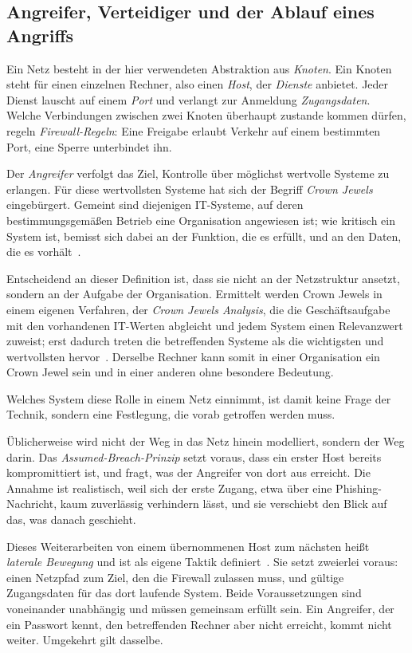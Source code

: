 \subsection{Angreifer, Verteidiger und der Ablauf eines Angriffs}
\label{sec:angreifer-verteidiger}

Ein Netz besteht in der hier verwendeten Abstraktion aus \emph{Knoten}. Ein
Knoten steht für einen einzelnen Rechner, also einen \emph{Host}, der
\emph{Dienste} anbietet. Jeder Dienst lauscht auf einem \emph{Port} und verlangt
zur Anmeldung \emph{Zugangsdaten}. Welche Verbindungen zwischen zwei Knoten
überhaupt zustande kommen dürfen, regeln \emph{Firewall-Regeln}: Eine Freigabe
erlaubt Verkehr auf einem bestimmten Port, eine Sperre unterbindet ihn.

Der \emph{Angreifer} verfolgt das Ziel, Kontrolle über möglichst wertvolle
Systeme zu erlangen. Für diese wertvollsten Systeme hat sich der Begriff
\emph{Crown Jewels} eingebürgert. Gemeint sind diejenigen IT-Systeme, auf deren
bestimmungsgemäßen Betrieb eine Organisation angewiesen ist; wie kritisch ein
System ist, bemisst sich dabei an der Funktion, die es erfüllt, und an den
Daten, die es vorhält~\cite[Abschn.~II.A]{gangupantulu2021cja}.

Entscheidend an dieser Definition ist, dass sie nicht an der Netzstruktur
ansetzt, sondern an der Aufgabe der Organisation. Ermittelt werden Crown Jewels
in einem eigenen Verfahren, der \emph{Crown Jewels Analysis}, die die
Geschäftsaufgabe mit den vorhandenen IT-Werten abgleicht und jedem System einen
Relevanzwert zuweist; erst dadurch treten die betreffenden Systeme als die
wichtigsten und wertvollsten hervor~\cite[Abschn.~II.A]{gangupantulu2021cja}.
Derselbe Rechner kann somit in einer Organisation ein Crown Jewel sein und in
einer anderen ohne besondere Bedeutung.

Welches System diese Rolle in einem Netz einnimmt, ist damit keine Frage der
Technik, sondern eine Festlegung, die vorab getroffen werden muss.

Üblicherweise wird nicht der Weg in das Netz hinein modelliert, sondern der Weg
darin. Das \emph{Assumed-Breach-Prinzip} setzt voraus, dass ein erster Host
bereits kompromittiert ist, und fragt, was der Angreifer von dort aus erreicht.
Die Annahme ist realistisch, weil sich der erste Zugang, etwa über eine
Phishing-Nachricht, kaum zuverlässig verhindern lässt, und sie verschiebt den
Blick auf das, was danach geschieht.

Dieses Weiterarbeiten von einem übernommenen Host zum nächsten heißt
\emph{laterale Bewegung} und ist als eigene Taktik
definiert~\cite{mitreattack}. Sie setzt zweierlei voraus: einen Netzpfad zum
Ziel, den die Firewall zulassen muss, und gültige Zugangsdaten für das dort
laufende System. Beide Voraussetzungen sind voneinander unabhängig und müssen
gemeinsam erfüllt sein. Ein Angreifer, der ein Passwort
kennt, den betreffenden Rechner aber nicht erreicht, kommt nicht weiter.
Umgekehrt gilt dasselbe.

